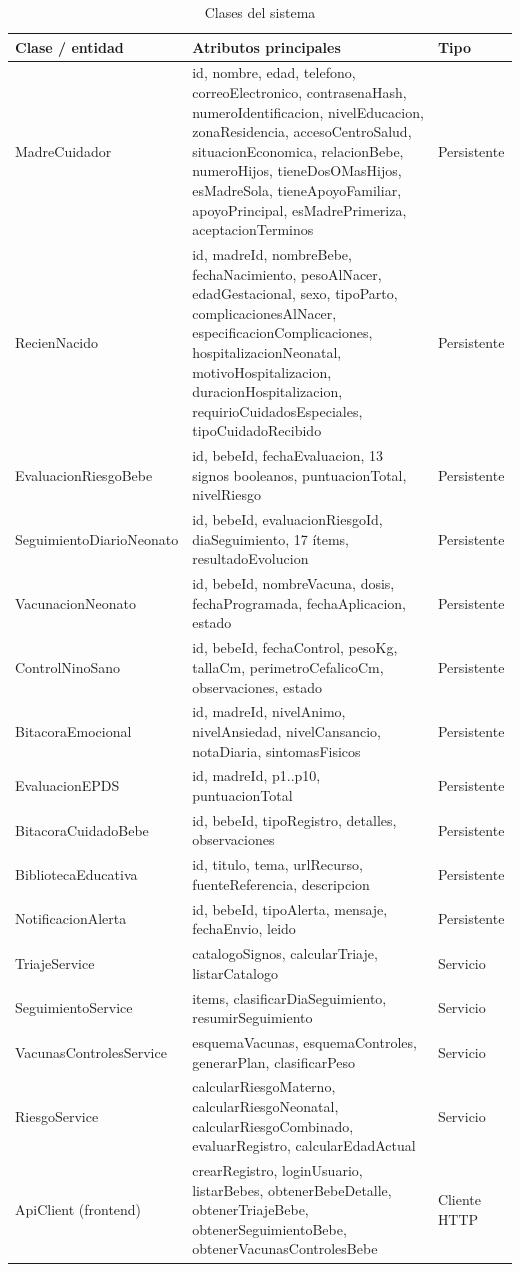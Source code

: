 \documentclass[12pt,letterpaper]{article}
\begin{document}
\begin{longtable}{p{}p{}p{}}
\caption{Clases del sistema}\\\toprule
\textbf{Clase / entidad} & \textbf{Atributos principales} & \textbf{Tipo} \\\midrule
\endhead
MadreCuidador & id, nombre, edad, telefono, correoElectronico, contrasenaHash, numeroIdentificacion, nivelEducacion, zonaResidencia, accesoCentroSalud, situacionEconomica, relacionBebe, numeroHijos, tieneDosOMasHijos, esMadreSola, tieneApoyoFamiliar, apoyoPrincipal, esMadrePrimeriza, aceptacionTerminos & Persistente\\\hline
RecienNacido & id, madreId, nombreBebe, fechaNacimiento, pesoAlNacer, edadGestacional, sexo, tipoParto, complicacionesAlNacer, especificacionComplicaciones, hospitalizacionNeonatal, motivoHospitalizacion, duracionHospitalizacion, requirioCuidadosEspeciales, tipoCuidadoRecibido & Persistente\\\hline
EvaluacionRiesgoBebe & id, bebeId, fechaEvaluacion, 13 signos booleanos, puntuacionTotal, nivelRiesgo & Persistente\\\hline
SeguimientoDiarioNeonato & id, bebeId, evaluacionRiesgoId, diaSeguimiento, 17 ítems, resultadoEvolucion & Persistente\\\hline
VacunacionNeonato & id, bebeId, nombreVacuna, dosis, fechaProgramada, fechaAplicacion, estado & Persistente\\\hline
ControlNinoSano & id, bebeId, fechaControl, pesoKg, tallaCm, perimetroCefalicoCm, observaciones, estado & Persistente\\\hline
BitacoraEmocional & id, madreId, nivelAnimo, nivelAnsiedad, nivelCansancio, notaDiaria, sintomasFisicos & Persistente\\\hline
EvaluacionEPDS & id, madreId, p1..p10, puntuacionTotal & Persistente\\\hline
BitacoraCuidadoBebe & id, bebeId, tipoRegistro, detalles, observaciones & Persistente\\\hline
BibliotecaEducativa & id, titulo, tema, urlRecurso, fuenteReferencia, descripcion & Persistente\\\hline
NotificacionAlerta & id, bebeId, tipoAlerta, mensaje, fechaEnvio, leido & Persistente\\\hline
TriajeService & catalogoSignos, calcularTriaje, listarCatalogo & Servicio\\\hline
SeguimientoService & items, clasificarDiaSeguimiento, resumirSeguimiento & Servicio\\\hline
VacunasControlesService & esquemaVacunas, esquemaControles, generarPlan, clasificarPeso & Servicio\\\hline
RiesgoService & calcularRiesgoMaterno, calcularRiesgoNeonatal, calcularRiesgoCombinado, evaluarRegistro, calcularEdadActual & Servicio\\\hline
ApiClient (frontend) & crearRegistro, loginUsuario, listarBebes, obtenerBebeDetalle, obtenerTriajeBebe, obtenerSeguimientoBebe, obtenerVacunasControlesBebe & Cliente HTTP\\\bottomrule
\end{longtable}
\end{document}
